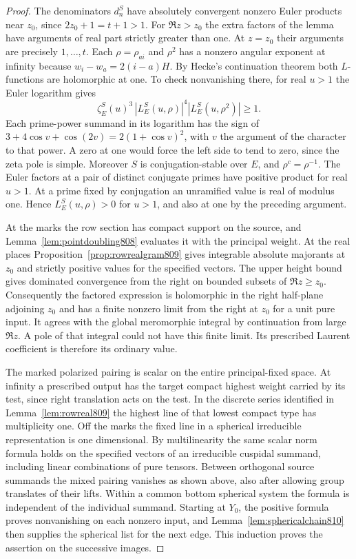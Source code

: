 \documentclass[a4paper,11pt]{article}
\theoremstyle{definition}
\theoremstyle{remark}
\numberwithin{equation}{section}
\begin{document}
\begin{proof}
The denominators \(d_n^S\) have absolutely convergent nonzero
Euler products near \(z_0\), since \(2z_0+1=t+1>1\). For
\(\Re z>z_0\) the extra factors of the lemma have arguments
of real part strictly greater than one. At \(z=z_0\) their
arguments are precisely \(1,\ldots,t\). Each \(\rho=\rho_{ai}\)
and \(\rho^2\) has a nonzero angular exponent at infinity
because \(w_i-w_a=2(i-a)H\). By Hecke's continuation theorem
both \(L\)-functions are holomorphic at one. To check nonvanishing
there, for real \(u>1\) the Euler logarithm gives
\[
 \zeta_E^S(u)^3\,|L_E^S(u,\rho)|^4 |L_E^S(u,\rho^2)|\geq1 .
\]
Each prime-power summand in its logarithm has the sign of
\(3+4\cos v+\cos(2v)=2(1+\cos v)^2\), with \(v\) the
argument of the character to that power. A zero at one would
force the left side to tend to zero, since the zeta pole is
simple. Moreover \(S\) is conjugation-stable over \(E\), and
\(\rho^c=\rho^{-1}\). The Euler factors at a pair of distinct
conjugate primes have positive product for real \(u>1\).
At a prime fixed by conjugation an unramified value is real
of modulus one. Hence \(L_E^S(u,\rho)>0\) for \(u>1\), and
also at one by the preceding argument.

At the marks the row section has compact support on the source,
and Lemma~\ref{lem:pointdoubling808} evaluates it with the
principal weight. At the real places Proposition~\ref{prop:rowrealgram809}
gives integrable absolute majorants at \(z_0\) and strictly
positive values for the specified vectors. The upper height
bound gives dominated convergence from the right on bounded
subsets of \(\Re z\ge z_0\). Consequently the factored expression
is holomorphic in the right half-plane adjoining \(z_0\) and
has a finite nonzero limit from the right at \(z_0\) for
a unit pure input. It agrees with the global meromorphic
integral by continuation from large \(\Re z\). A pole of that
integral could not have this finite limit. Its prescribed
Laurent coefficient is therefore its ordinary value.

The marked polarized pairing is scalar on the entire
principal-fixed space. At infinity a prescribed output has
the target compact highest weight carried by its test, since
right translation acts on the test. In the discrete series
identified in Lemma~\ref{lem:rowreal809} the highest line of
that lowest compact type has multiplicity one. Off the marks
the fixed line in a spherical irreducible representation is
one dimensional. By multilinearity the same scalar norm
formula holds on the specified vectors of an irreducible
cuspidal summand, including linear combinations of pure
tensors. Between orthogonal source summands the mixed
pairing vanishes as shown above, also after allowing group
translates of their lifts. Within a common bottom spherical
system the formula is independent of the individual summand.
Starting at \(Y_0\), the positive formula proves nonvanishing
on each nonzero input, and Lemma~\ref{lem:sphericalchain810}
then supplies the spherical list for the next edge. This
induction proves the assertion on the successive images.
\end{proof}
\end{document}

